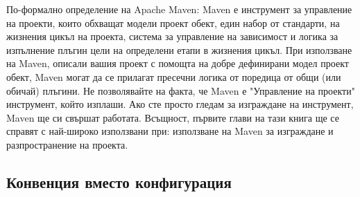 По-формално определение на Apache Maven: Maven е инструмент за
управление на проекти, които обхващат модели проект обект, един набор
от стандарти, на жизнения цикъл на проекта, система за управление на
зависимост и логика за изпълнение плъгин цели на определени етапи в
жизнения цикъл. При използване на Maven, описали вашия проект с
помощта на добре дефинирани модел проект обект, Maven могат да се
прилагат пресечни логика от поредица от общи (или обичай) плъгини.  Не
позволявайте на факта, че Maven е "Управление на проекти" инструмент,
който изплаши. Ако сте просто гледам за изграждане на инструмент,
Maven ще си свършат работата. Всъщност, първите глави на тази книга ще
се справят с най-широко използвани при: използване на Maven за
изграждане и разпространение на проекта.
\subsection{Конвенция вместо конфигурация}

